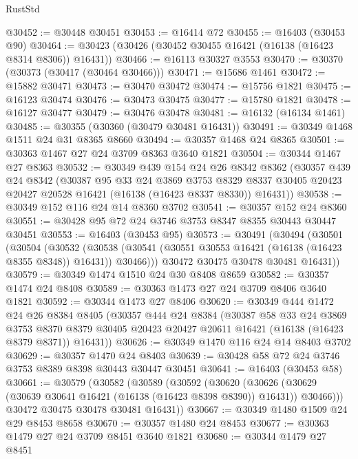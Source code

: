 \begin{lexlean}{RustStd}
\begin{coremodule}
@30452 := @30448 @30451
@30453 := @16414 @72
@30455 := @16403 (@30453 @90)
@30464 := @30423 (@30426 (@30452 @30455 @16421 (@16138 (@16423 @8314 @8306)) @16431))
@30466 := @16113 @30327 @3553
@30470 := @30370 (@30373 (@30417 (@30464 @30466)))
@30471 := @15686 @1461
@30472 := @15882 @30471
@30473 := @30470 @30472
@30474 := @15756 @1821
@30475 := @16123 @30474
@30476 := @30473 @30475
@30477 := @15780 @1821
@30478 := @16127 @30477
@30479 := @30476 @30478
@30481 := @16132 (@16134 @1461)
@30485 := @30355 (@30360 (@30479 @30481 @16431))
@30491 := @30349 @1468 @1511 @24 @31 @8365 @8660
@30494 := @30357 @1468 @24 @8365
@30501 := @30363 @1467 @27 @24 @3709 @8363 @3640 @1821
@30504 := @30344 @1467 @27 @8363
@30532 := @30349
    @439
    @154
    @24
    @26
    @8342
    @8362
    (@30357
      @439
      @24
      @8342
      (@30387
        @95
        @33
        @24
        @3869
        @3753
        @8329
        @8337
        @30405
        @20423
        @20427
        @20528
        @16421
        (@16138 (@16423 @8337 @8330))
        @16431))
@30538 := @30349 @152 @116 @24 @14 @8360 @3702
@30541 := @30357 @152 @24 @8360
@30551 := @30428 @95 @72 @24 @3746 @3753 @8347 @8355 @30443 @30447 @30451
@30553 := @16403 (@30453 @95)
@30573 := @30491
    (@30494
      (@30501
        (@30504
          (@30532
            (@30538 (@30541 (@30551 @30553 @16421 (@16138 (@16423 @8355 @8348)) @16431)) @30466)))
        @30472
        @30475
        @30478
        @30481
        @16431))
@30579 := @30349 @1474 @1510 @24 @30 @8408 @8659
@30582 := @30357 @1474 @24 @8408
@30589 := @30363 @1473 @27 @24 @3709 @8406 @3640 @1821
@30592 := @30344 @1473 @27 @8406
@30620 := @30349
    @444
    @1472
    @24
    @26
    @8384
    @8405
    (@30357
      @444
      @24
      @8384
      (@30387
        @58
        @33
        @24
        @3869
        @3753
        @8370
        @8379
        @30405
        @20423
        @20427
        @20611
        @16421
        (@16138 (@16423 @8379 @8371))
        @16431))
@30626 := @30349 @1470 @116 @24 @14 @8403 @3702
@30629 := @30357 @1470 @24 @8403
@30639 := @30428 @58 @72 @24 @3746 @3753 @8389 @8398 @30443 @30447 @30451
@30641 := @16403 (@30453 @58)
@30661 := @30579
    (@30582
      (@30589
        (@30592
          (@30620
            (@30626 (@30629 (@30639 @30641 @16421 (@16138 (@16423 @8398 @8390)) @16431)) @30466)))
        @30472
        @30475
        @30478
        @30481
        @16431))
@30667 := @30349 @1480 @1509 @24 @29 @8453 @8658
@30670 := @30357 @1480 @24 @8453
@30677 := @30363 @1479 @27 @24 @3709 @8451 @3640 @1821
@30680 := @30344 @1479 @27 @8451

\end{coremodule}
\end{lexlean}
